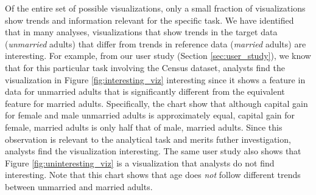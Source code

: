 \begin{example}
Of the entire set of possible visualizations, only a small fraction of visualizations
show trends and information relevant for the specific task.
We have identified that in many analyses, visualizations that show trends in the target 
data ({\em unmarried} adults) that differ from trends in reference data ({\em married}
adults) are interesting.
For example, from our user study (Section \ref{sec:user_study}), we know that for this
particular task involving the Census dataset,
analysts find the visualization in Figure \ref{fig:interesting_viz} interesting since it shows 
a feature in data for unmarried adults that is significantly different from the equivalent feature 
for married adults.
Specifically, the chart show that although capital gain for female and male unmarried adults 
is approximately equal, capital gain for female, married adults is only half that of male, 
married adults.
Since this observation is relevant to the analytical task and merits futher investigation,
analysts find the visualization interesting.
The same user study also shows that Figure \ref{fig:uninteresting_viz} is a visualization that 
analysts do not find interesting. 
Note that this chart shows that age does {\em not} follow different trends between unmarried
and married adults.
\end{example}


